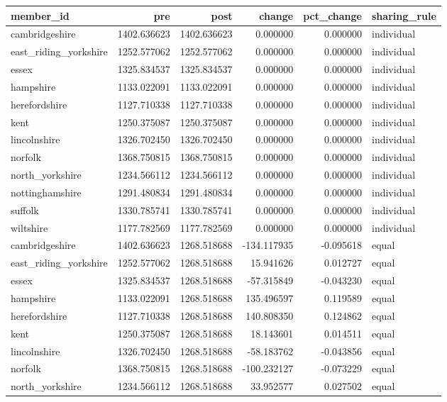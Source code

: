\begin{tabular}{lrrrrl}
\toprule
member\_id & pre & post & change & pct\_change & sharing\_rule \\
\midrule
cambridgeshire & 1402.636623 & 1402.636623 & 0.000000 & 0.000000 & individual \\
east\_riding\_yorkshire & 1252.577062 & 1252.577062 & 0.000000 & 0.000000 & individual \\
essex & 1325.834537 & 1325.834537 & 0.000000 & 0.000000 & individual \\
hampshire & 1133.022091 & 1133.022091 & 0.000000 & 0.000000 & individual \\
herefordshire & 1127.710338 & 1127.710338 & 0.000000 & 0.000000 & individual \\
kent & 1250.375087 & 1250.375087 & 0.000000 & 0.000000 & individual \\
lincolnshire & 1326.702450 & 1326.702450 & 0.000000 & 0.000000 & individual \\
norfolk & 1368.750815 & 1368.750815 & 0.000000 & 0.000000 & individual \\
north\_yorkshire & 1234.566112 & 1234.566112 & 0.000000 & 0.000000 & individual \\
nottinghamshire & 1291.480834 & 1291.480834 & 0.000000 & 0.000000 & individual \\
suffolk & 1330.785741 & 1330.785741 & 0.000000 & 0.000000 & individual \\
wiltshire & 1177.782569 & 1177.782569 & 0.000000 & 0.000000 & individual \\
cambridgeshire & 1402.636623 & 1268.518688 & -134.117935 & -0.095618 & equal \\
east\_riding\_yorkshire & 1252.577062 & 1268.518688 & 15.941626 & 0.012727 & equal \\
essex & 1325.834537 & 1268.518688 & -57.315849 & -0.043230 & equal \\
hampshire & 1133.022091 & 1268.518688 & 135.496597 & 0.119589 & equal \\
herefordshire & 1127.710338 & 1268.518688 & 140.808350 & 0.124862 & equal \\
kent & 1250.375087 & 1268.518688 & 18.143601 & 0.014511 & equal \\
lincolnshire & 1326.702450 & 1268.518688 & -58.183762 & -0.043856 & equal \\
norfolk & 1368.750815 & 1268.518688 & -100.232127 & -0.073229 & equal \\
north\_yorkshire & 1234.566112 & 1268.518688 & 33.952577 & 0.027502 & equal \\

\end{tabular}
